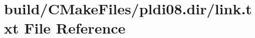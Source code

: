 \hypertarget{pldi08_8dir_2link_8txt}{}\section{build/\+C\+Make\+Files/pldi08.dir/link.txt File Reference}
\label{pldi08_8dir_2link_8txt}
